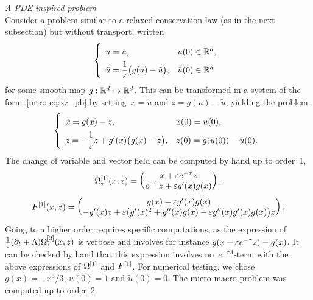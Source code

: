 \medskip
\noindent\textit{A PDE-inspired problem}\\
%
Consider a problem similar to a relaxed conservation law (as in the next
subsection) but without transport, written
\begin{equation*}
  \left\lbrace\begin{array}{ll} 
    \dot u = \tilde{u} , 
    & u(0) \in \mathbb{R}^{d} , \displaystyle \vphantom{\int} 
    \\ \displaystyle
    \dot{\tilde{u}} = \frac{1}{\varepsilon} \big( g(u) - \tilde{u} \big) ,
    & \tilde{u}(0) \in \mathbb{R}^{d} 
  \end{array}\right.
\end{equation*}
for some smooth map $g: \mathbb{R}^{d} \mapsto \mathbb{R}^{d}$. This can be
transformed in a system of the form~\eqref{intro-eq:xz_pb} by setting~$x =
u$ and $z = g(u) - \tilde{u}$, yielding the problem 
\begin{equation} \label{sec:tests:eq:hyperb_ode}
  \left\lbrace\begin{array}{ll} \displaystyle \vphantom{\int}
    \dot x = g(x) - z , 
    & x(0) = u(0) , \\ \displaystyle
    \dot z = -\frac{1}{\varepsilon} z + g'(x) \big( g(x) - z \big) ,
    & z(0) = g(u(0)) - \tilde{u}(0) .
  \end{array}\right.
\end{equation}
The change of variable and vector field can be computed by hand up
to order~1,
\begin{equation*}
  \Omega^{[1]}_{\tau}(x,z) = \begin{pmatrix}
    x + \varepsilon e^{-\tau} z \\
    e^{-\tau} z + \varepsilon g'(x) g(x)
  \end{pmatrix} ,
\end{equation*}
\begin{equation*}
  F^{[1]}(x,z) = \begin{pmatrix}
    g(x) - \varepsilon g'(x) g(x) 
    \\
    - g'(x) z + \varepsilon \big(g'(x)^2 + g''(x)g(x) 
    - \varepsilon g''(x)g'(x)g(x) \big) z
  \end{pmatrix} .
\end{equation*}
Going to a higher order requires specific computations, as the expression
of $\frac{1}{\varepsilon} (\partial_t + \Lambda) \Omega^{[2]} _\tau(x,z)$ is verbose and
involves for instance $g(x + \varepsilon e^{-\tau}z) - g(x)$. 
It can be checked by hand that this expression involves no~$e^{-\tau
\Lambda}$-term with the above expressions of $\Omega^{[1]}$ and $F^{[1]}$.
For numerical testing, we chose~$g(x) = -x^3/3$, $u(0) = 1$ and
$\tilde{u}(0) = 0$. The micro-macro problem was computed up to order~2. 

